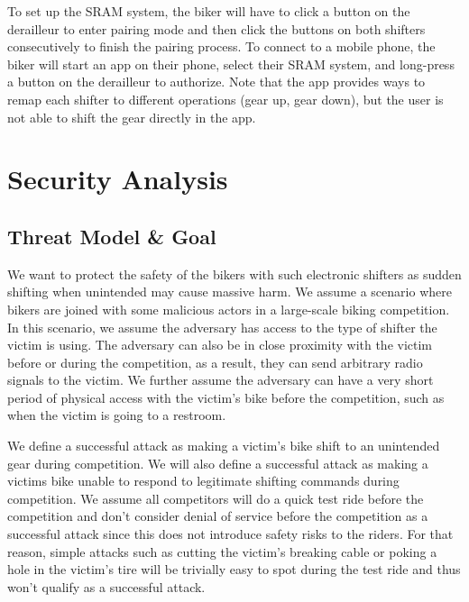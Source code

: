 \documentclass[letterpaper,twocolumn,10pt]{article}
\begin{document}
To set up the SRAM system, the biker will have to click a button on the derailleur to enter pairing mode and then click the buttons on both shifters consecutively to finish the pairing process. To connect to a mobile phone, the biker will start an app on their phone, select their SRAM system, and long-press a button on the derailleur to authorize. Note that the app provides ways to remap each shifter to different operations (gear up, gear down), but the user is not able to shift the gear directly in the app.




\section{Security Analysis}



\subsection{Threat Model \& Goal}
We want to protect the safety of the bikers with such electronic shifters as sudden shifting when unintended may cause massive harm. We assume a scenario where bikers are joined with some malicious actors in a large-scale biking competition. In this scenario, we assume the adversary has access to the type of shifter the victim is using. The adversary can also be in close proximity with the victim before or during the competition, as a result, they can send arbitrary radio signals to the victim. We further assume the adversary can have a very short period of physical access with the victim's bike before the competition, such as when the victim is going to a restroom.

We define a successful attack as making a victim's bike shift to an unintended gear during competition. We will also define a successful attack as making a victims bike unable to respond to legitimate shifting commands during competition. We assume all competitors will do a quick test ride before the competition and don't consider denial of service before the competition as a successful attack since this does not introduce safety risks to the riders. For that reason, simple attacks such as cutting the victim's breaking cable or poking a hole in the victim's tire will be trivially easy to spot during the test ride and thus won't qualify as a successful attack.
\end{document}

